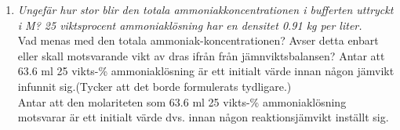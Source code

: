 \documentclass[./chem_exercises.tex]{subfiles}
\begin{document}
\begin{enumerate}[label=(\alph*)]
\item \textit{Ungefär hur stor blir den totala ammoniakkoncentrationen i bufferten uttryckt i
M? 25 viktsprocent ammoniaklösning har en densitet  0.91 kg per liter.}\\

Vad menas med den totala ammoniak-koncentrationen? Avser detta  enbart eller skall motsvarande
vikt av  dras ifrån från jämnviktsbalansen?
Antar  att 63.6 ml 25 vikts-\% ammoniaklösning är ett initialt värde innan någon
jämvikt infunnit sig.(Tycker att det borde formulerats tydligare.)\\

Antar att den molariteten som 63.6 ml 25 vikts-\% ammoniaklösning motsvarar är ett initialt
värde dvs. innan någon reaktionsjämvikt inställt sig.


\end{enumerate}
\end{document}

